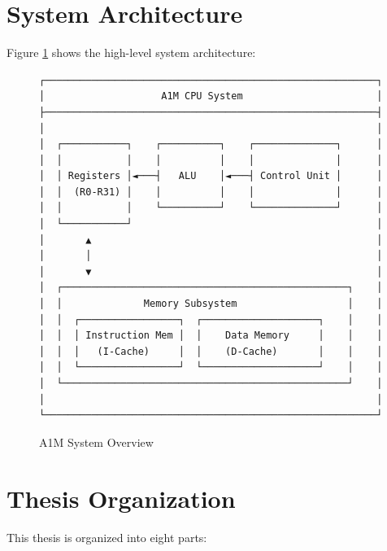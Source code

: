 \documentclass[12pt,a4paper,oneside]{book}
\begin{document}
\section{System Architecture}

Figure \ref{fig:system-overview} shows the high-level system architecture:

\begin{figure}[H]
\centering
\begin{verbatim}
┌─────────────────────────────────────────────────────────┐
│                    A1M CPU System                       │
├─────────────────────────────────────────────────────────┤
│                                                         │
│  ┌───────────┐    ┌──────────┐    ┌──────────────┐      │
│  │           │    │          │    │              │      │
│  │ Registers │◄───┤   ALU    │◄───┤ Control Unit │      │
│  │  (R0-R31) │    │          │    │              │      │
│  │           │    └──────────┘    └──────────────┘      │
│  └───────────┘                                          │
│       ▲                                                 │
│       │                                                 │
│       ▼                                                 │
│  ┌─────────────────────────────────────────────────┐    │
│  │              Memory Subsystem                   │    │
│  │  ┌─────────────────┐  ┌────────────────────┐    │    │
│  │  │ Instruction Mem │  │    Data Memory     │    │    │
│  │  │   (I-Cache)     │  │    (D-Cache)       │    │    │
│  │  └─────────────────┘  └────────────────────┘    │    │
│  └─────────────────────────────────────────────────┘    │
│                                                         │
└─────────────────────────────────────────────────────────┘
\end{verbatim}
\caption{A1M System Overview}
\label{fig:system-overview}
\end{figure}

\section{Thesis Organization}

This thesis is organized into eight parts:
\end{document}
